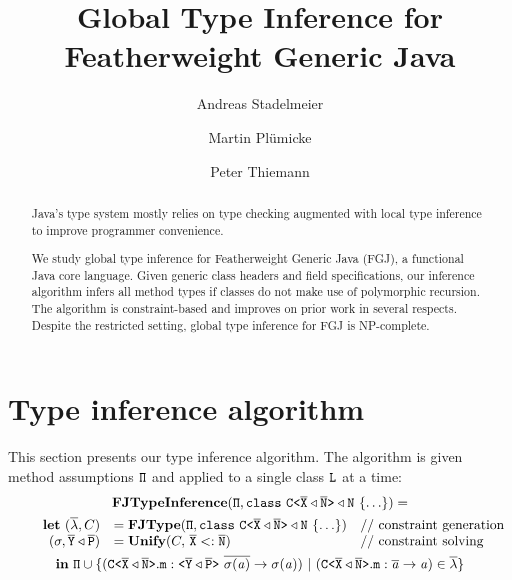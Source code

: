 \documentclass[a4paper,USenglish,cleveref, autoref, thm-restate, anonymous]{lipics-v2021}
\title{Global Type Inference for Featherweight Generic Java} %
\author{Andreas Stadelmeier}{DHBW Stuttgart, Campus Horb, Germany}{a.stadelmeier@hb.dhbw-stuttgart.de}{}{}%
\author{Martin Plümicke}{DHBW Stuttgart, Campus Horb, Germany}{pl@dhbw.de}{}{}
\author{Peter Thiemann}{Universität Freiburg, Institut für Informatik, Germany}{thiemann@informatik.uni-freiburg.de}{}{}
\begin{document}
\maketitle

\begin{abstract}
  Java's type system mostly relies on type checking augmented with
  local type inference to improve programmer convenience.

  We study global type inference for Featherweight Generic Java (FGJ), a
  functional Java core language. Given generic class headers and field
  specifications, our inference algorithm infers all method types if
  classes do not make use of polymorphic recursion.
  The algorithm is constraint-based and improves on prior work in
  several respects. Despite the restricted setting, global type
  inference for FGJ is NP-complete.
\end{abstract}









\section{Type inference algorithm}
\label{sec:type-infer-algor}
This section presents our type inference algorithm.
The algorithm is given method assumptions ${\tt \Pi}$ and applied to a
single class ${\tt L}$ at a time:
\begin{gather*}
\fjtypeinference(\mv{\Pi}, \texttt{class}\ \exptype{C}{\ol{X}
\triangleleft \ol{N}} \triangleleft \type{N}\ \{ \ldots \}) = \\
\quad \quad \begin{array}[t]{rll}
  \textbf{let}\ 
  (\overline{\methodAssumption}, \consSet) &= \fjtype{}(\mv{\Pi}, \texttt{class}\ \exptype{C}{\ol{X}
  \triangleleft \ol{N}} \triangleleft \type{N}\ \{ \ldots \}) &
                                                                     \text{// constraint generation}\\
              {(\sigma,  \ol{Y} \triangleleft \ol{P})} &= \unify{}(\consSet,\, \ol{X} <: \ol{N}) & \text{// constraint solving}\\
\end{array}\\
\textbf{in}\ \mv\Pi \cup
\set{(\exptype{C}{\ol{X} \triangleleft \ol{N}}.\mv{m} : \exptype{}{\ol{Y} \triangleleft \ol{P}}\ \ol{\sigma(\tv{a})} \to \sigma(\tv{a})) \ |\ (\exptype{C}{\ol{X} \triangleleft \ol{N}}.\mv{m} : \ol{\tv{a}} \to \tv{a}) \in \overline{\methodAssumption}}
\end{gather*}
\end{document}
